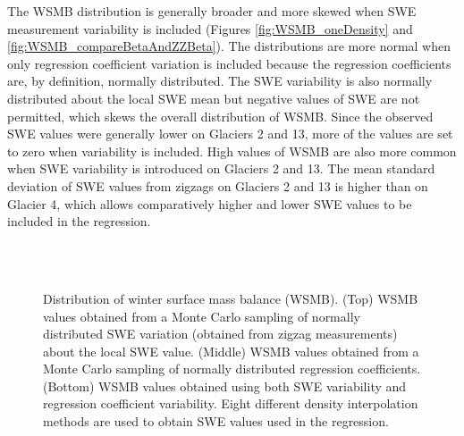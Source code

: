 \documentclass[12pt]{article}
\begin{document}
The WSMB distribution is generally broader and more skewed when SWE measurement variability is included (Figures \ref{fig:WSMB_oneDensity} and \ref{fig:WSMB_compareBetaAndZZBeta}). The distributions are more normal when only regression coefficient variation is included because the regression coefficients are, by definition, normally distributed. The SWE variability is also normally distributed about the local SWE mean but negative values of SWE are not permitted, which skews the overall distribution of WSMB. Since the observed SWE values were generally lower on Glaciers 2 and 13, more of the values are set to zero when variability is included.  High values of WSMB are also more common when SWE variability is introduced on Glaciers 2 and 13. The mean standard deviation of SWE values from zigzags on Glaciers 2 and 13 is higher than on Glacier 4, which allows comparatively higher and lower SWE values to be included in the regression. 

\begin{figure}[H]
	\centering
	\\%
	\\%
	\caption{Distribution of winter surface mass balance (WSMB). (Top) WSMB values obtained from a Monte Carlo sampling of normally distributed SWE variation (obtained from zigzag measurements) about the local SWE value. (Middle) WSMB values obtained from a Monte Carlo sampling of normally distributed regression coefficients. (Bottom) WSMB values obtained using both SWE variability and regression coefficient variability. Eight different density interpolation methods are used to obtain SWE values used in the regression.}
	\label{fig:WSMB_allDensity}
\end{figure}
\end{document}
